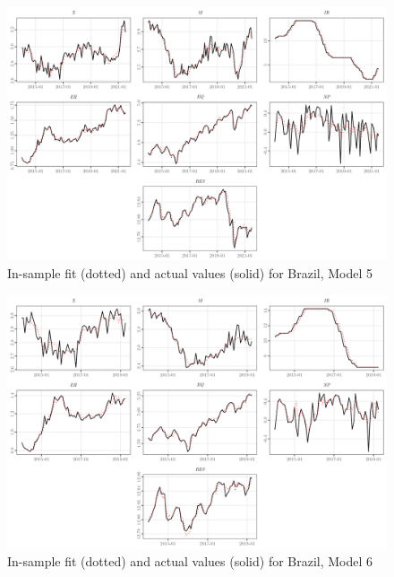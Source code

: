 \documentclass[a4paper, twoside]{templates/ociamthesis}
\begin{document}
\begin{figure}[!ht]

{\centering \includegraphics[width=0.99\columnwidth]{figure/g.model5t.BR} 

}

\caption{In-sample fit (dotted) and actual values (solid) for Brazil, Model 5}\label{fig:Figure5FITBR5}
\end{figure}

\begin{figure}[!ht]

{\centering \includegraphics[width=0.99\columnwidth]{figure/g.model6t.BR} 

}

\caption{In-sample fit (dotted) and actual values (solid) for Brazil, Model 6}\label{fig:Figure5FITBR6}
\end{figure}

\clearpage
\end{document}
